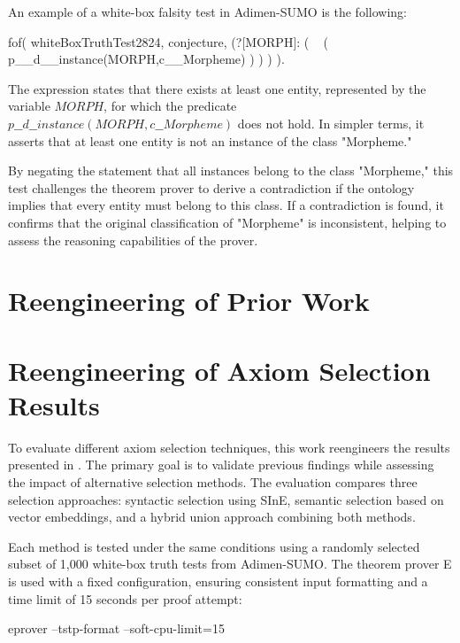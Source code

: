 \documentclass[english,version-2020-11]{uzl-thesis}
\begin{document}
An example of a white-box falsity test in Adimen-SUMO is the following:

\begin{Pseudocode}[morekeywords = {add, create}, deletekeywords={to}, numbers=left,
    caption = {WhiteboxTruthTest example}]
    fof( whiteBoxTruthTest2824, conjecture,
        (?[MORPH]: 
            (
                ~ (
                    p__d__instance(MORPH,c__Morpheme)
                )
            )
        )
    ).
\end{Pseudocode}


The expression states that there exists at least one entity, represented by the variable \( MORPH \), for which the predicate \( p\_\_d\_\_instance(MORPH, c\_\_Morpheme) \) does not hold. In simpler terms, it asserts that at least one entity is not an instance of the class "Morpheme."

By negating the statement that all instances belong to the class "Morpheme," this test challenges the theorem prover to derive a contradiction if the ontology implies that every entity must belong to this class. If a contradiction is found, it confirms that the original classification of "Morpheme" is inconsistent, helping to assess the reasoning capabilities of the prover.

\section{Reengineering of Prior Work}

\section{Reengineering of Axiom Selection Results}

To evaluate different axiom selection techniques, this work reengineers the results presented in \cite{Schon2024}. The primary goal is to validate previous findings while assessing the impact of alternative selection methods. The evaluation compares three selection approaches: syntactic selection using SInE, semantic selection based on vector embeddings, and a hybrid union approach combining both methods.

Each method is tested under the same conditions using a randomly selected subset of 1,000 white-box truth tests from Adimen-SUMO. The theorem prover E is used with a fixed configuration, ensuring consistent input formatting and a time limit of 15 seconds per proof attempt:

\begin{Pseudocode}[morekeywords = {add, create}, deletekeywords={to}, numbers=left,
    caption = {Prover E configuration}]
    eprover --tstp-format --soft-cpu-limit=15
\end{Pseudocode}
\end{document}
